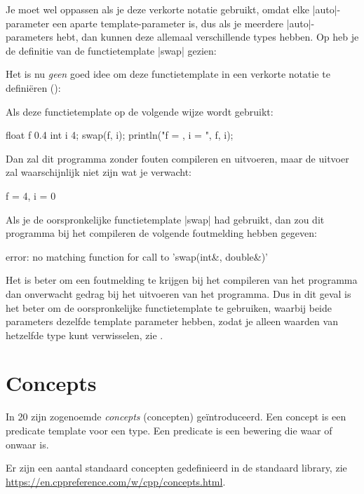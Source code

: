 \begin{cpplstShortInline}
Je moet wel oppassen als je deze verkorte notatie gebruikt, omdat elke |auto|\hyp{}parameter een aparte template\hyp{}parameter is, dus als je meerdere |auto|-parameters hebt, dan kunnen deze allemaal verschillende types hebben.
Op  heb je de definitie van de functietemplate |swap| gezien:

Het is nu \emph{geen} goed idee om deze functietemplate in een verkorte notatie te definiëren ():

Als deze functietemplate op de volgende wijze wordt gebruikt:
\begin{cpplstfragment}
	float f {0.4}
	int i {4}; 
	swap(f, i);
	println("f = {}, i = {}", f, i);
\end{cpplstfragment}

Dan zal dit programma zonder fouten compileren en uitvoeren, maar de uitvoer zal waarschijnlijk niet zijn wat je verwacht:
\begin{coutput}
f = 4, i = 0
\end{coutput}

Als je de oorspronkelijke functietemplate |swap| had gebruikt, dan zou dit programma bij het compileren de volgende foutmelding hebben gegeven:
\begin{coutput}
error: no matching function for call to 'swap(int&, double&)' 
\end{coutput}
Het is beter om een foutmelding te krijgen bij het compileren van het programma dan onverwacht gedrag bij het uitvoeren van het programma.
Dus in dit geval is het beter om de oorspronkelijke functietemplate te gebruiken, 
waarbij beide parameters dezelfde template parameter hebben, zodat je alleen waarden van hetzelfde type kunt verwisselen, zie .

\section{Concepts}
\label{sec:concepts}
In \Cpp{}20 zijn zogenoemde \emph{concepts} (concepten) geïntroduceerd.
Een concept is een predicate template voor een type.
Een predicate is een bewering die waar of onwaar is.

Er zijn een aantal standaard concepten gedefinieerd in de standaard library, zie \url{https://en.cppreference.com/w/cpp/concepts.html}.


\end{cpplstShortInline}
